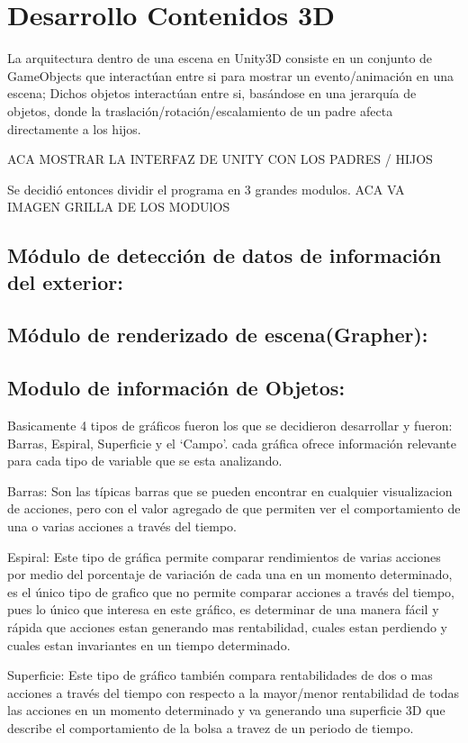 \section{Desarrollo Contenidos 3D}
La arquitectura dentro de una escena en Unity3D consiste en un conjunto de GameObjects que interactúan entre si para mostrar un evento/animación en una escena; Dichos objetos interactúan entre si, basándose en una jerarquía de objetos, donde la traslación/rotación/escalamiento de un padre afecta directamente a los hijos.

ACA MOSTRAR LA INTERFAZ DE UNITY CON LOS PADRES / HIJOS

Se decidió entonces dividir el programa en 3 grandes modulos.
ACA VA IMAGEN GRILLA DE LOS MODUlOS
\subsection{Módulo de detección de datos de información del exterior:}

\subsection{Módulo de renderizado de escena(Grapher):}

\subsection{Modulo de información de Objetos:}



Basicamente 4 tipos de gráficos fueron los que se decidieron desarrollar y fueron: Barras, Espiral, Superficie y el `Campo'. cada gráfica ofrece información relevante para cada tipo de variable que se esta analizando. 

Barras: Son las típicas barras que se pueden encontrar en cualquier visualizacion de acciones, pero con el valor agregado de que permiten ver el comportamiento de una o varias acciones a través del tiempo.

Espiral: Este tipo de gráfica permite comparar rendimientos de varias acciones por medio del porcentaje de variación de cada una en un momento determinado, es el único tipo de grafico que no permite comparar acciones a través del tiempo, pues lo único que interesa en este gráfico, es determinar de una manera fácil y rápida que acciones estan generando mas rentabilidad, cuales estan perdiendo y cuales estan invariantes en un tiempo determinado.

Superficie: Este tipo de gráfico también compara rentabilidades de dos o mas acciones a través del tiempo con respecto a la mayor/menor  rentabilidad de todas las acciones en un momento determinado  y va generando una superficie 3D que describe el comportamiento de la bolsa a travez de un periodo de tiempo.

